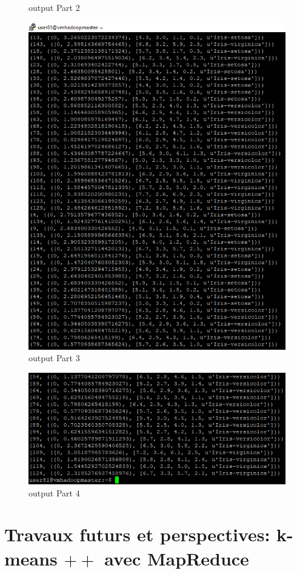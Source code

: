 \documentclass[12pt]{article}
\numberwithin{equation}{section}
\theoremstyle{plain}
\begin{document}
\begin{figure}[H]
\caption{output Part 2
}
\end{figure}\begin{figure}[H]
\centering
\includegraphics{out3}
\caption{output Part 3
}
\end{figure}\begin{figure}[H]
\centering
\includegraphics{out4}
\caption{output Part 4
}
\end{figure}
\section{Travaux futurs et perspectives: k-means $++$ avec MapReduce}
\end{document}
